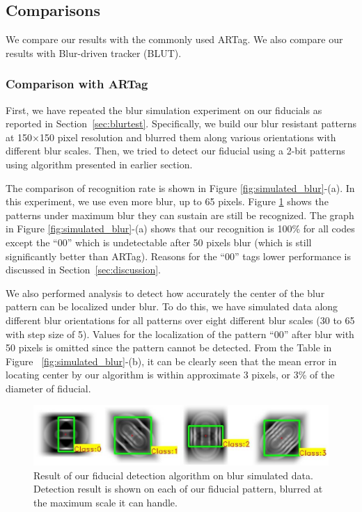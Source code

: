 \documentclass[10pt,twocolumn,letterpaper]{article}
\begin{document}
\subsection{Comparisons}

We compare our results with the commonly used ARTag. We also compare
our results with Blur-driven tracker (BLUT)\cite{Wu:2011}.
\subsubsection{Comparison with ARTag}
First, we have repeated the blur simulation experiment on our fiducials as reported
in Section~\ref{sec:blurtest}.  Specifically, we build our blur resistant
patterns at 150$\times$150 pixel resolution and blurred them along various
orientations with different blur scales. Then, we tried to detect our fiducial using a 2-bit
patterns using algorithm presented in earlier section.

The comparison of recognition rate is shown in Figure
\ref{fig:simulated_blur}-(a). In this experiment, we use even more blur, up to 65
pixels. Figure \ref{fig:blur_maximum} shows the patterns under maximum blur they
can sustain are still be recognized. The graph in Figure
\ref{fig:simulated_blur}-(a) shows that our recognition is 100\% for all codes
except the ``00'' which is undetectable after 50 pixels blur (which is still
significantly better than ARTag).  Reasons for the ``00'' tags lower
performance is discussed in Section~\ref{sec:discussion}.

We also performed analysis to detect how accurately the center of the blur pattern 
can be localized under blur.  To do this, we have simulated data along different blur
orientations for all patterns over eight different blur scales (30 to 65 with
step size of 5). Values for the localization of the pattern ``00'' after blur
with 50 pixels is omitted since the pattern cannot be detected. From the Table in Figure
~\ref{fig:simulated_blur}-(b), it can be clearly seen that the mean error in
locating center by our algorithm is within approximate 3 pixels, or 3\% of the
diameter of fiducial.

\begin{figure}
\includegraphics[width=\linewidth]{blur_maximum.pdf}
\caption{Result of our fiducial detection algorithm on blur simulated data.
Detection result is shown on each of our fiducial pattern, blurred at the
maximum scale it can handle.}
\label{fig:blur_maximum}
\end{figure}
\end{document}
